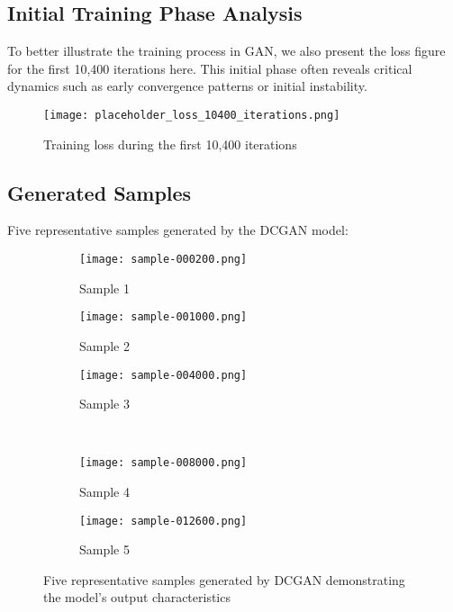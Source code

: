 \documentclass{article}
\begin{document}
\subsection{Initial Training Phase Analysis}
To better illustrate the training process in GAN, we also present the loss figure for the first 10,400 iterations here. This initial phase often reveals critical dynamics such as early convergence patterns or initial instability.

\begin{figure}[H]
    \centering
    \texttt{[image: placeholder\_loss\_10400\_iterations.png]}
    \caption{Training loss during the first 10,400 iterations}
    \label{fig:Training loss first 10400 iterations}
\end{figure}

\subsection{Generated Samples}
Five representative samples generated by the DCGAN model:

\begin{figure}[H]
\centering
\begin{subfigure}{0.32\textwidth}
    \texttt{[image: sample-000200.png]}
    \caption{Sample 1}
    \label{fig:dcgan_sample 200 iterations}
\end{subfigure}
\hfill
\begin{subfigure}{0.32\textwidth}
    \texttt{[image: sample-001000.png]}
    \caption{Sample 2}
    \label{fig:dcgan_sample 1000 iterations}
\end{subfigure}
\hfill
\begin{subfigure}{0.32\textwidth}
    \texttt{[image: sample-004000.png]}
    \caption{Sample 3}
    \label{fig:dcgan_sample 4000 iterations}
\end{subfigure}
\\
\begin{subfigure}{0.32\textwidth}
    \texttt{[image: sample-008000.png]}
    \caption{Sample 4}
    \label{fig:dcgan_sample 8000 iterations}
\end{subfigure}
\hfill
\begin{subfigure}{0.32\textwidth}
    \texttt{[image: sample-012600.png]}
    \caption{Sample 5}
    \label{fig:dcgan_sample 12600 iterations}
\end{subfigure}
\caption{Five representative samples generated by DCGAN demonstrating the model's output characteristics}
\label{fig:dcgan_samples}
\end{figure}
\end{document}
